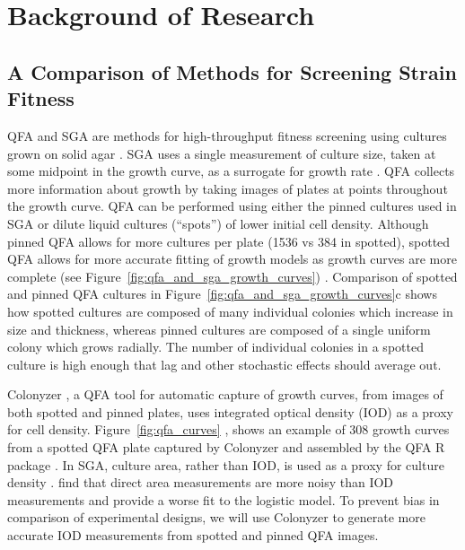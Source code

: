 \graphicspath{{images_low_res/}}

\section{Background of Research}
\label{sec:background}

\subsection{A Comparison of Methods for Screening Strain Fitness }

QFA and SGA are methods for high-throughput fitness screening using cultures grown on
solid agar \citep{Baryshnikova2010sga,Banks2012}. SGA uses a single measurement of culture
size, taken at some midpoint in the growth curve, as a surrogate for growth rate
\citep{Baryshnikova2010sga}. QFA collects more information about growth by taking images
of plates at points throughout the growth curve. QFA can be performed using either the
pinned cultures used in SGA or dilute liquid cultures (``spots'') of lower initial cell
density. Although pinned QFA allows for more cultures per plate (1536 vs 384 in spotted),
spotted QFA allows for more accurate fitting of growth models as growth curves are more
complete (see Figure~\ref{fig:qfa_and_sga_growth_curves}) \citep{Lawless2010}. Comparison
of spotted and pinned QFA cultures in Figure~\ref{fig:qfa_and_sga_growth_curves}c shows
how spotted cultures are composed of many individual colonies which increase in size and
thickness, whereas pinned cultures are composed of a single uniform colony which grows
radially. The number of individual colonies in a spotted culture is high enough that lag
and other stochastic effects should average out.

Colonyzer \citep{Lawless2010}, a QFA tool for automatic capture of growth curves, from
images of both spotted and pinned plates, uses integrated optical density (IOD) as a proxy
for cell density. Figure~\ref{fig:qfa_curves} \citep{Banks2012}, shows an example of 308
growth curves from a spotted QFA plate captured by Colonyzer and assembled by the QFA R
package \citep{qfa2016}. In SGA, culture area, rather than IOD, is used as a proxy for
culture density \citep{Baryshnikova2010sga}. \citet{Lawless2010} find that direct area
measurements are more noisy than IOD measurements and provide a worse fit to the logistic
model. To prevent bias in comparison of experimental designs, we will use Colonyzer to
generate more accurate IOD measurements from spotted and pinned QFA images.

